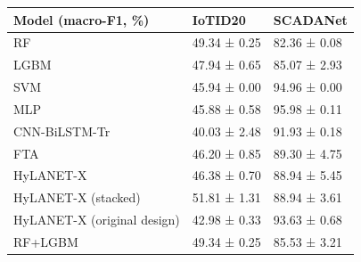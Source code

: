 \begin{tabular}{lll}
\toprule
Model (macro-F1, \%) & IoTID20 & SCADANet \\
\midrule
RF & 49.34 ± 0.25 & 82.36 ± 0.08 \\
LGBM & 47.94 ± 0.65 & 85.07 ± 2.93 \\
SVM & 45.94 ± 0.00 & 94.96 ± 0.00 \\
MLP & 45.88 ± 0.58 & 95.98 ± 0.11 \\
CNN-BiLSTM-Tr & 40.03 ± 2.48 & 91.93 ± 0.18 \\
FTA & 46.20 ± 0.85 & 89.30 ± 4.75 \\
HyLANET-X & 46.38 ± 0.70 & 88.94 ± 5.45 \\
HyLANET-X (stacked) & 51.81 ± 1.31 & 88.94 ± 3.61 \\
HyLANET-X (original design) & 42.98 ± 0.33 & 93.63 ± 0.68 \\
RF+LGBM & 49.34 ± 0.25 & 85.53 ± 3.21 \\
\bottomrule
\end{tabular}
